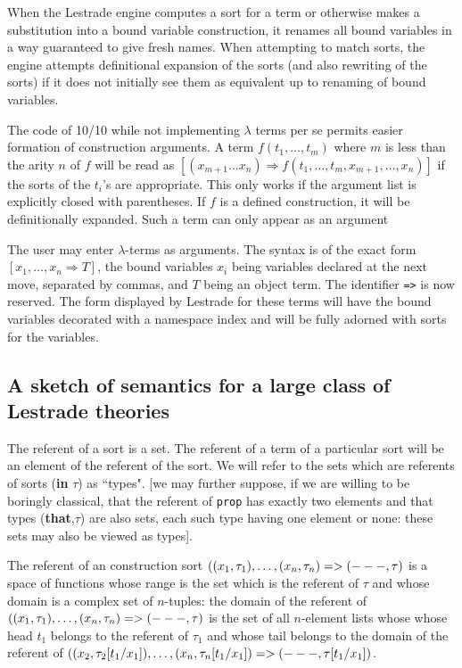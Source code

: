 \documentclass[12pt]{article}
\begin{document}
When the Lestrade engine computes a sort for a term or otherwise makes a substitution into a bound variable construction, it renames all bound variables in a way guaranteed to give fresh names.   When attempting to match sorts, the engine attempts definitional expansion of the sorts (and also rewriting of the sorts) if it does not initially see them as equivalent up to renaming of bound variables.

 The code of 10/10 while not implementing $\lambda$ terms per se permits easier formation of construction arguments.
A term $f(t_1,\ldots,t_m)$ where $m$ is less than the arity $n$ of $f$ will be read as $[(x_{m+1}\ldots x_n) \Rightarrow f(t_1,\ldots,t_m,x_{m+1},\dots,x_n)]$ if the sorts of the $t_i$'s are appropriate.  This only works if the argument list is explicitly closed with parentheses.  If $f$ is a defined construction, it will be definitionally expanded.   Such a term can only appear as an argument

  The user may enter $\lambda$-terms as arguments.  The syntax is of the exact form $[x_1,\ldots,x_n \Rightarrow T]$, the bound variables $x_i$ being variables declared at the next move, separated by commas, and $T$ being an object term.  The identifier {\tt =>} is now reserved.  The form displayed by Lestrade for these terms will have the bound variables decorated with a namespace index and will be fully adorned with sorts for the variables.
\newpage

\subsection{A sketch of semantics for a large class of  Lestrade theories}

The referent of a sort is a set.   The referent of a term of a particular sort will be an element of the referent of the sort.  We will refer to the sets which are referents of sorts ({\bf in} $\tau$) as ``types".  [we may further suppose, if we are willing to be boringly classical,  that the referent of {\tt prop} has exactly two elements and that types ({\bf that},$\tau$) are also sets, each such type having one element or none:  these sets may also be viewed as types].

The referent of an construction sort $((x_1,\tau_1),\ldots,(x_n,\tau_n) => ({\bf ---},\tau)$ is a space of functions whose range is the set which is the referent of $\tau$
and whose domain is a complex set of $n$-tuples:  the domain of the referent of $((x_1,\tau_1),\ldots,(x_n,\tau_n) => ({\bf ---},\tau)$ is the set of all $n$-element lists whose
whose head $t_1$ belongs to the referent of $\tau_1$ and whose tail belongs to the domain of the referent of $((x_2,\tau_2[t_1/x_1]),\ldots,(x_n,\tau_n[t_1/x_1]) => ({\bf ---},\tau[t_1/x_1])$.
\end{document}
